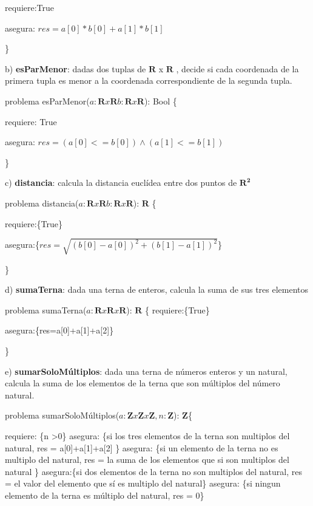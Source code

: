 \documentclass{article}
\begin{document}
    requiere:{True}


    asegura: {$res = a[0]*b[0] + a[1]*b[1]$}

\} \newline

b) \textbf{esParMenor}: dadas dos tuplas de $\mathbf{R}$ x $\mathbf{R}$ , decide si cada coordenada de la primera tupla es menor a la coordenada correspondiente de la segunda tupla. \newline

problema esParMenor($a: \mathbf{R} x \mathbf{R} b: \mathbf{R} x \mathbf{R}$): Bool \{


    requiere: {True}


    asegura: {$res = (a[0]<= b[0]) \wedge (a[1]<=b[1])$}

\} \newline


c) \textbf{distancia}: calcula la distancia euclídea entre dos puntos de $\mathbf{R^2}$ \newline

problema distancia($a: \mathbf{R} x \mathbf{R} b: \mathbf{R} x \mathbf{R}$): $\mathbf{R}$ \{

    requiere:\{True\}

    
    asegura:\{$res = \sqrt{(b[0]-a[0])^2+(b[1]-a[1])^2}$\}


\}\newline


d) \textbf{sumaTerna}: dada una terna de enteros, calcula la suma de sus tres elementos \newline

problema sumaTerna($a: \mathbf{R}x\mathbf{R}x\mathbf{R}$): $\mathbf{R}$ \{
    requiere:\{True\}

    asegura:\{res=a[0]+a[1]+a[2]\}

\} \newline

e) \textbf{sumarSoloMúltiplos}: dada una terna de números enteros y un natural, calcula la suma de los elementos de la terna que son múltiplos del número natural.\newline

problema sumarSoloMúltiplos($a:\mathbf{Z}x\mathbf{Z}x\mathbf{Z}, n:\mathbf{Z}$): $\mathbf{Z}$\{


    requiere: \{n >0\}
    asegura: \{si los tres elementos de la terna son multiplos del natural, res = a[0]+a[1]+a[2] \}
    asegura: \{si un elemento de la terna no es multiplo del natural, res = la suma de los elementos que si son multiplos del natural \}
    asegura:\{si dos elementos de la terna no son multiplos del natural, res = el valor del elemento que sí es multiplo del natural\}
    asegura: \{si ningun elemento de la terna es múltiplo del natural, res = 0\}
\end{document}
